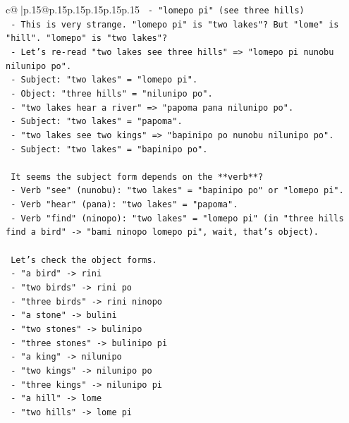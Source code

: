 \documentclass{article}
\begin{document}
{\begin{supertabular}{c@{$\;$}|p{.15\linewidth}@{}p{.15\linewidth}p{.15\linewidth}p{.15\linewidth}p{.15\linewidth}p{.15\linewidth}}
{{{\texttt{    {-} "lomepo pi" (see three hills)} \\
\texttt{  {-} This is very strange. "lomepo pi" is "two lakes"? But "lome" is "hill". "lomepo" is "two lakes"?} \\
\texttt{  {-} Let's re{-}read "two lakes see three hills" => "lomepo pi nunobu nilunipo po".} \\
\texttt{    {-} Subject: "two lakes" = "lomepo pi".} \\
\texttt{    {-} Object: "three hills" = "nilunipo po".} \\
\texttt{  {-} "two lakes hear a river" => "papoma pana nilunipo po".} \\
\texttt{    {-} Subject: "two lakes" = "papoma".} \\
\texttt{  {-} "two lakes see two kings" => "bapinipo po nunobu nilunipo po".} \\
\texttt{    {-} Subject: "two lakes" = "bapinipo po".} \\
\\ 
\texttt{  It seems the subject form depends on the **verb**?} \\
\texttt{  {-} Verb "see" (nunobu): "two lakes" = "bapinipo po" or "lomepo pi".} \\
\texttt{  {-} Verb "hear" (pana): "two lakes" = "papoma".} \\
\texttt{  {-} Verb "find" (ninopo): "two lakes" = "lomepo pi" (in "three hills find a bird" {-}> "bami ninopo lomepo pi", wait, that's object).} \\
\\ 
\texttt{  Let's check the object forms.} \\
\texttt{  {-} "a bird" {-}> rini} \\
\texttt{  {-} "two birds" {-}> rini po} \\
\texttt{  {-} "three birds" {-}> rini ninopo} \\
\texttt{  {-} "a stone" {-}> bulini} \\
\texttt{  {-} "two stones" {-}> bulinipo} \\
\texttt{  {-} "three stones" {-}> bulinipo pi} \\
\texttt{  {-} "a king" {-}> nilunipo} \\
\texttt{  {-} "two kings" {-}> nilunipo po} \\
\texttt{  {-} "three kings" {-}> nilunipo pi} \\
\texttt{  {-} "a hill" {-}> lome} \\
\texttt{  {-} "two hills" {-}> lome pi} \\
}}}
\end{supertabular}}
\end{document}
